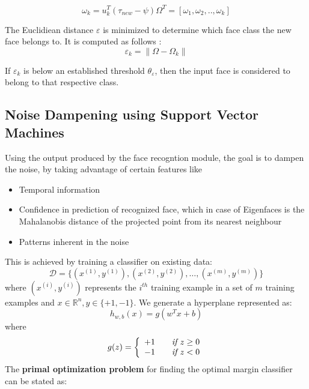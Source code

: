 \documentclass[%
        final,
        internal,
        notitlepage,
        narroweqnarray,
        inline,
        ]{ieee}
\begin{document}
\begin{equation}
\omega_{k} = u_{k}^{T}(\tau_{new} - \psi)	\Omega^{T} = [\omega_{1},\omega_{2},..,\omega_{k}] 
\end{equation}

The Euclidiean distance $\varepsilon$ is minimized to determine which face class the new face belongs to. It is computed as follows \cite{eigtut}:
\begin{equation}
\varepsilon_{k} = \parallel\Omega - \Omega_{k}\parallel 
\end{equation}

If $\varepsilon_{k}$ is below an established threshold $\theta_{\varepsilon}$, then the input face is considered to belong to that respective class.


\subsection{Noise Dampening using Support Vector Machines}
Using the output produced by the face recogntion module, the goal is to dampen the noise, by taking advantage of certain features like
\begin{itemize}
	\item Temporal information
	\item Confidence in prediction of recognized face, which in case of Eigenfaces is the Mahalanobis distance of the projected point from its nearest neighbour
	\item Patterns inherent in the noise
\end{itemize}
This is achieved by training a classifier on existing data:
\begin{equation}
\mathcal {D} = \{(x^{(1)},y^{(1)}),(x^{(2)},y^{(2)}),\ldots,(x^{(m)},y^{(m)})\}
\end{equation}
where $(x^{(i)}, y^{(i)})$ represents the $i^{th}$ training example in a set of $m$ training examples and $x \in \mathbb{R}^n, y \in \{+1, -1\}$. We generate a hyperplane represented as:
\begin{equation}
h_{w,b}(x) = g(w^Tx + b)
\end{equation}
where
\begin{equation}
g(z) = \left\{
\begin{array}{l l}
+1 & \quad \textit{if $z \geq 0$}\\
-1 & \quad \textit{if $z < 0$}\\
\end{array} \right.
\end{equation}
The \textbf{primal optimization problem} for finding the optimal margin classifier can be stated as:
\end{document}
